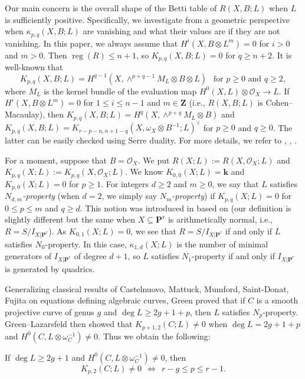 \documentclass[graybox]{svmult}
\newcommand{\Z}{\mathbf{Z}}
\newcommand{\kk}{\mathbf{k}}
\newcommand{\sO}{\mathscr{O}}
\def\nP{\mathbf{P}}
\def\reg{\operatorname{reg}}
\begin{document}
Our main concern is the overall shape of the Betti table of $R(X,B;L)$ when $L$ is sufficiently positive. Specifically, we investigate from a geometric perspective when $\kappa_{p,q}(X,B;L)$ are vanishing and what their values are if they are not vanishing. In this paper, we always assume that $H^i(X, B \otimes L^m)=0$ for $i>0$ and $m>0$. Then $\reg(R) \leq n+1$, so $K_{p,q}(X, B; L) = 0$ for $q \geq n+2$. It is well-known that
$$
K_{p,q}(X, B; L)=H^{q-1}(X, \wedge^{p+q-1}M_L  \otimes B \otimes L)~~\text{ for $p \geq 0$ and $q \geq 2$},
$$
where $M_L$ is the kernel bundle of the evaluation map $H^0(X, L)\otimes \sO_X \to L$. If $H^i(X, B \otimes L^m)=0$ for $1 \leq i \leq n-1$ and $m \in \Z$ (i.e., $R(X, B; L)$ is Cohen--Macaulay), then $K_{p,q}(X, B; L)=H^{q}(X, \wedge^{p+q}M_L  \otimes B)$ and $K_{p,q}(X, B; L) = K_{r-p-n, n+1-q}(X, \omega_X \otimes B^{-1}; L)^{\vee}$ for $p \geq 0$ and $q \geq 0$. The latter can be easily checked using Serre duality.
For more details, we refer to \cite[Chapter 2]{AN}, \cite[Section 3]{EL1}, \cite[Section 2]{Park3}.

For a moment, suppose that $B=\sO_X$. We put $R(X;L):=R(X,\sO_X;L)$ and $K_{p,q}(X; L):=K_{p,q}(X, \sO_X; L)$. We know $K_{0,0}(X; L)= \kk$ and $K_{p,0}(X;L)=0$ for $p \geq 1$. For integers $d \geq 2$ and $m \geq 0$, we say that $L$ satisfies \emph{$N_{d,m}$-property} (when $d=2$, we simply say  \emph{$N_m$-property}) if $K_{p,q}(X; L) = 0$ for $0 \leq p \leq m$ and $q \geq d$. This notion was introduced in \cite{EGHP} based on \cite{GL1, GL2} (our definition is slightly different but the same when $X \subseteq \nP^r$ is arithmetically normal, i.e., $R=S/I_{X|\nP^r}$). As $K_{0,1}(X;L)=0$, we see that $R=S/I_{X|\nP^r}$ if and only if $L$ satisfies $N_0$-property. In this case, $\kappa_{1,d}(X;L)$ is the number of minimal generators of $I_{X|\nP^r}$ of degree $d+1$, so $L$ satisfies $N_1$-property if and only if $I_{X|\nP^r}$ is generated by quadrics. 

Generalizing classical results of Castelnuovo, Mattuck, Mumford, Saint-Donat, Fujita on equations defining algebraic curves, Green \cite[Theorem 4.a.1]{Green1} proved that if $C$ is a smooth projective curve of genus $g$ and $\deg L \geq 2g+1+p$, then $L$ satisfies $N_p$-property. Green--Lazarsfeld \cite[Theorem 1.2]{GL2} then showed that $K_{p+1,2}(C; L) \neq 0$ when $\deg L = 2g+1+p$ and $H^0(C, L \otimes \omega_C^{-1}) \neq 0$. Thus we obtain the following:

\begin{theorem}[{$\operatorname{char}(\kk)=0$}]\label{thm:Green}
If $\deg L \geq 2g+1$ and $H^0(C, L \otimes \omega_C^{-1}) \neq 0$, then 
$$
K_{p,2}(C; L) \neq 0~~\Longleftrightarrow~~r-g \leq p \leq r-1.
$$
\end{theorem}
\end{document}
